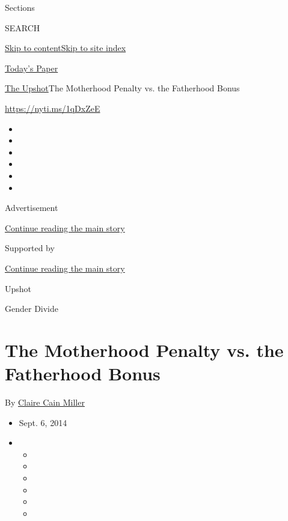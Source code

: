 Sections

SEARCH

\protect\hyperlink{site-content}{Skip to
content}\protect\hyperlink{site-index}{Skip to site index}

\href{https://myaccount.nytimes3xbfgragh.onion/auth/login?response_type=cookie\&client_id=vi}{}

\href{https://www.nytimes3xbfgragh.onion/section/todayspaper}{Today's
Paper}

\href{/section/upshot}{The Upshot}\textbar{}The Motherhood Penalty vs.
the Fatherhood Bonus

\url{https://nyti.ms/1qDxZeE}

\begin{itemize}
\item
\item
\item
\item
\item
\item
\end{itemize}

Advertisement

\protect\hyperlink{after-top}{Continue reading the main story}

Supported by

\protect\hyperlink{after-sponsor}{Continue reading the main story}

Upshot

Gender Divide

\hypertarget{the-motherhood-penalty-vs-the-fatherhood-bonus}{%
\section{The Motherhood Penalty vs. the Fatherhood
Bonus}\label{the-motherhood-penalty-vs-the-fatherhood-bonus}}

By \href{http://www.nytimes3xbfgragh.onion/by/claire-cain-miller}{Claire
Cain Miller}

\begin{itemize}
\item
  Sept. 6, 2014
\item
  \begin{itemize}
  \item
  \item
  \item
  \item
  \item
  \item
  \end{itemize}
\end{itemize}

